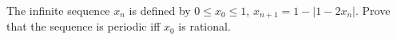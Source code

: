 The infinite sequence $x_n$ is defined by $0 \leq x_0 \leq 1$, $x_{n+1} = 1 - |1 - 2x_n|$. Prove that the sequence is periodic iff $x_0$ is rational.
